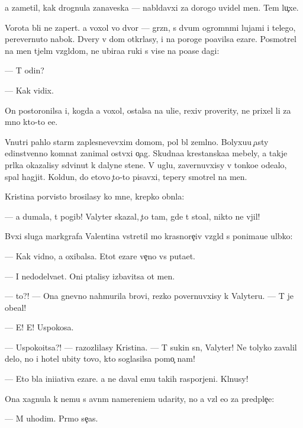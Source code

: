 \documentclass[10pt]{book}
\begin{document}
{\Y}a zametil, kak drognula zanaveska — nabl{\iu}davxi{\y} za dorogo{\y} uvidel men{\ia}. Tem lu{\c}xe.

Vorota b{\yi}li ne zapert{\yi}. {\Y}a  voxol vo dvor — gr{\ia}zn{\yi}{\y}, s dvum{\ia} ogromn{\yi}mi lujami i telego{\y}, perevernuto{\y} nabok. Dvery v dom otkr{\yi}lasy, i na poroge po{\y}avilsa {\C}ezare. Posmotrel na men{\ia} t{\ia}jel{\yi}m vzgl{\ia}dom, ne ubira{\y}a ruki s vis{\ia}{\x}e{\y} na po{\y}ase dagi:

— T{\yi} odin?

— Kak vidix.

On postoronilsa i, kogda {\y}a  voxol, ostalsa na uli{\q}e, rexiv proverity, ne prixel li za mno{\y} kto-to {\y}e{\x}e.

Vnutri pahlo star{\yi}m zaplesnevevxim domom, pol b{\yi}l zeml{\ia}no{\y}. Bolyxu{\y}u {\c}asty {\y}edinstvenno{\y} komnat{\yi} zanimal ost{\yi}vxi{\y} o{\c}ag. Skudna{\y}a krest{\y}anska{\y}a mebely, a takje pr{\ia}lka okazalisy sdvinut{\yi} k dalyne{\y} stene. V uglu, zavernuvxisy v tonko{\y}e ode{\y}alo, spal hagjit. Koldun, do etovo {\c}to-to pisavxi{\y}, tepery smotrel na men{\ia}.

Kristina por{\yi}visto brosilasy ko mne, krepko obn{\ia}la:

— {\Y}a dumala, t{\yi} pogib! Valyter skazal, {\c}to tam, gde t{\yi} sto{\y}al, nikto ne v{\yi}jil!

B{\yi}vxi{\y} sluga markgrafa Valentina vstretil mo{\y} krasnore{\c}iv{\yi}{\y} vzgl{\ia}d s ponima{\y}u{\x}e{\y} ul{\yi}bko{\y}:

— Kak vidno, {\y}a oxibalsa. Etot {\C}ezare ve{\c}no vs{\e} puta{\y}et.

— I nedodel{\yi}va{\y}et. Oni p{\yi}talisy izbavitsa ot men{\ia}.

— {\C}to?! — Ona gnevno nahmurila brovi, rezko povernuvxisy k Valyteru. — T{\yi} je obe{\x}al!

— E{\y}! E{\y}! Uspoko{\y}sa.

— Uspoko{\y}itsa?! — razozlilasy Kristina. — T{\yi} sukin s{\yi}n, Valyter! Ne tolyko zavalil delo, no i hotel ubity tovo, kto soglasilsa pomo{\c} nam!

— Eto b{\yi}la ini{\q}iativa {\C}ezare. {\Y}a ne daval {\y}emu takih raspor{\ia}jeni{\y}. Kl{\ia}nusy!

Ona xagnula k nemu s {\y}avn{\yi}m namereni{\y}em udarity, no {\y}a vz{\ia}l {\y}e{\y}o za predple{\c}{\y}e:

— M{\yi} uhodim. Pr{\ia}mo se{\y}{\c}as.
\end{document}
